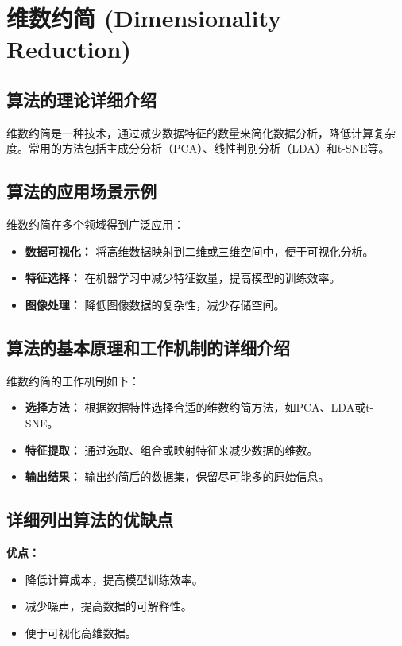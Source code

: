 \section{维数约简 (Dimensionality Reduction)}
\subsection*{算法的理论详细介绍}
维数约简是一种技术，通过减少数据特征的数量来简化数据分析，降低计算复杂度。常用的方法包括主成分分析（PCA）、线性判别分析（LDA）和t-SNE等。

\subsection*{算法的应用场景示例}
维数约简在多个领域得到广泛应用：
\begin{itemize}
    \item \textbf{数据可视化：} 将高维数据映射到二维或三维空间中，便于可视化分析。
    \item \textbf{特征选择：} 在机器学习中减少特征数量，提高模型的训练效率。
    \item \textbf{图像处理：} 降低图像数据的复杂性，减少存储空间。
\end{itemize}

\subsection*{算法的基本原理和工作机制的详细介绍}
维数约简的工作机制如下：
\begin{itemize}
    \item \textbf{选择方法：} 根据数据特性选择合适的维数约简方法，如PCA、LDA或t-SNE。
    \item \textbf{特征提取：} 通过选取、组合或映射特征来减少数据的维数。
    \item \textbf{输出结果：} 输出约简后的数据集，保留尽可能多的原始信息。
\end{itemize}

\subsection*{详细列出算法的优缺点}
\textbf{优点：}
\begin{itemize}
    \item 降低计算成本，提高模型训练效率。
    \item 减少噪声，提高数据的可解释性。
    \item 便于可视化高维数据。
\end{itemize}

